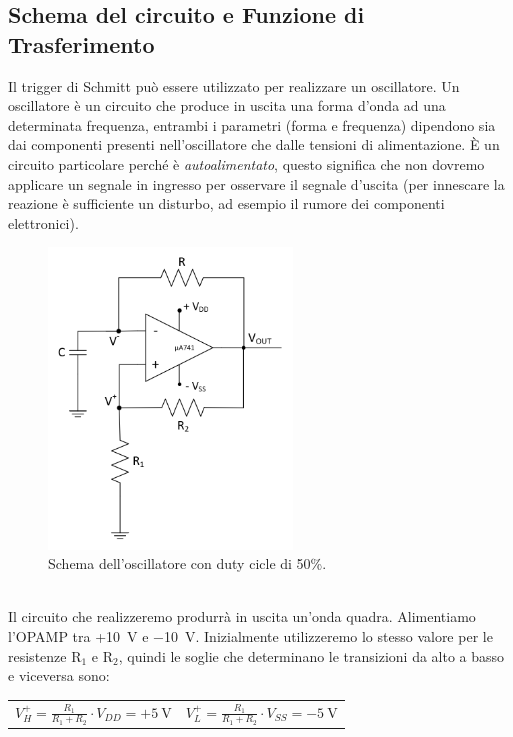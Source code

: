 \documentclass{report}
\begin{document}
\subsection{Schema del circuito e Funzione di Trasferimento}
Il trigger di Schmitt può essere utilizzato per realizzare un oscillatore. Un oscillatore è un circuito  che produce in uscita una forma d'onda ad una determinata frequenza, entrambi i parametri (forma e frequenza) dipendono sia dai componenti presenti nell'oscillatore che dalle tensioni di alimentazione. \`E un circuito particolare perché è \textit{autoalimentato}, questo significa che non dovremo applicare un segnale in ingresso per osservare il segnale d'uscita (per innescare la reazione è sufficiente un disturbo, ad esempio il rumore dei componenti elettronici).
\begin{figure}[h!]
	\centering
	\includegraphics[height=8cm]{immagini/schema3}
	\caption{Schema dell'oscillatore con duty cicle di 50\%.}
	\label{figura:schema3}
\end{figure}
\\Il circuito che realizzeremo produrrà in uscita un'onda quadra. Alimentiamo l'OPAMP tra +\SI{10}{\volt} e \SI{-10}{\volt}. Inizialmente utilizzeremo lo stesso valore per le resistenze $\mathrm{R_1}$ e $\mathrm{R_2}$, quindi le soglie che determinano le transizioni da alto a basso e viceversa sono:
\begin{table}[h!]
	\centering
	\begin{tabular}{cc}
		$\displaystyle{V_H^+=\frac{R_1}{R_1+R_2}\cdot V_{DD}=+\SI{5}{\volt}}$\;\;\;\;\;\;\;\;\;\;\;\;\;\;\;\;\;\;\;\; & $\displaystyle{V_L^+=\frac{R_1}{R_1+R_2}\cdot V_{SS}=-\SI{5}{\volt}}$\\ 
	\end{tabular}
\end{table}
\end{document}

